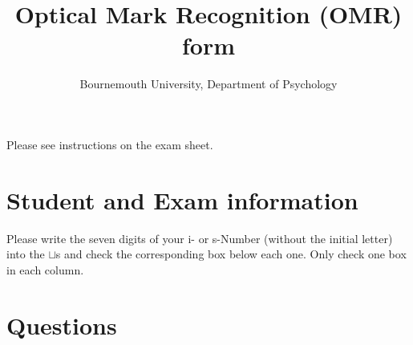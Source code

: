 \documentclass[
  english,
  pagemark,
  stamp]{sdapsclassic}
\author{Bournemouth University, Department of Psychology}
\title{Optical Mark Recognition (OMR) form}
\newcounter{question_number}
\begin{document}

  \begin{questionnaire}[noinfo]
    \begin{info}
      Please see instructions on the exam sheet.
    \end{info}


    \section{Student and Exam information}
  \begin{multicols}{3}
  \end{multicols}
\begin{multicols}{2}
    \begin{choicegroup}{Please write the seven digits of your i- or s-Number (without the initial letter) into the $\sqcup$s and check the corresponding box below each one. Only check one box in each column.\columnbreak}
	
       \groupaddchoice{\Huge$\sqcup$}
       \groupaddchoice{\Huge$\sqcup$}
       \groupaddchoice{\Huge$\sqcup$}
       \groupaddchoice{\Huge$\sqcup$}
       \groupaddchoice{\Huge$\sqcup$}
       \groupaddchoice{\Huge$\sqcup$}
       \groupaddchoice{\Huge$\sqcup$}
       \groupaddchoice{\Huge$\sqcup$}

    \end{choicegroup}
\end{multicols}
    \section{Questions}
\begin{multicols}{3}

    \begin{choicegroup}{}

    \end{choicegroup}

    \end{multicols}

  \end{questionnaire}
\end{document}
